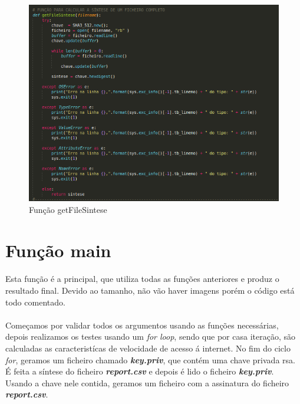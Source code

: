 \documentclass{report}
\begin{document}
\begin{figure}[H]
\centering
\includegraphics[width=1.1\linewidth]{getFileSintese.png}
\caption{Função getFileSintese}
\label{getFileSint}
\end{figure}


\newpage


\section{Função main }
\label{sec:main}
\paragraph{}
Esta função é a principal, que utiliza todas as funções anteriores e produz o resultado final. Devido ao tamanho, não vão haver imagens porém o código está todo comentado.
\paragraph{}
Começamos por validar todos os argumentos usando as funções necessárias, depois realizamos os testes usando um \textit{for loop}, sendo que por casa iteração, são calculadas as caracteristícas de velocidade de acesso á internet.
No fim do ciclo \textit{for}, geramos um ficheiro chamado \textbf{\textit{key.priv}}, que contém uma chave privada {\acs{rsa}}. É feita a síntese do ficheiro \textbf{\textit{report.csv}} e depois é lido o ficheiro \textbf{\textit{key.priv}}.
Usando a chave nele contida, geramos um ficheiro com a assinatura do ficheiro \textbf{\textit{report.csv}}.
\end{document}

